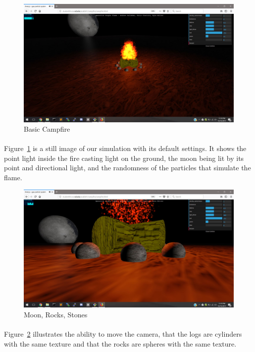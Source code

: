 \documentclass[letterpaper]{article}
\begin{document}
\begin{figure}[H]
\centering
\includegraphics[scale=.35]{result1.JPG}
\caption{Basic Campfire}
\label{fig:result1}
\end{figure}
\paragraph{}
Figure~\ref{fig:result1} is a still image of our simulation with its default settings. It shows the point light inside the fire casting light on the ground, the moon being lit by its point and directional light, and the randomness of the particles that simulate the flame.

\begin{figure}[H]
\centering
\includegraphics[scale=.35]{result2.JPG}
\caption{Moon, Rocks, Stones}
\label{fig:result2}
\end{figure}
\paragraph{}
Figure~\ref{fig:result2} illustrates the ability to move the camera, that the logs are cylinders with the same texture and that the rocks are spheres with the same texture.
\end{document}
